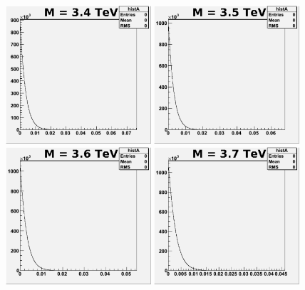 \begin{figure}[!ht]
  \begin{center}
     \includegraphics[width=0.48\textwidth]{Figures/MCpost3400_6_pe0.pdf}
     \includegraphics[width=0.48\textwidth]{Figures/MCpost3500_6_pe0.pdf}
     \includegraphics[width=0.48\textwidth]{Figures/MCpost3600_6_pe0.pdf}
     \includegraphics[width=0.48\textwidth]{Figures/MCpost3700_6_pe0.pdf}

\end{center}
\end{figure}

